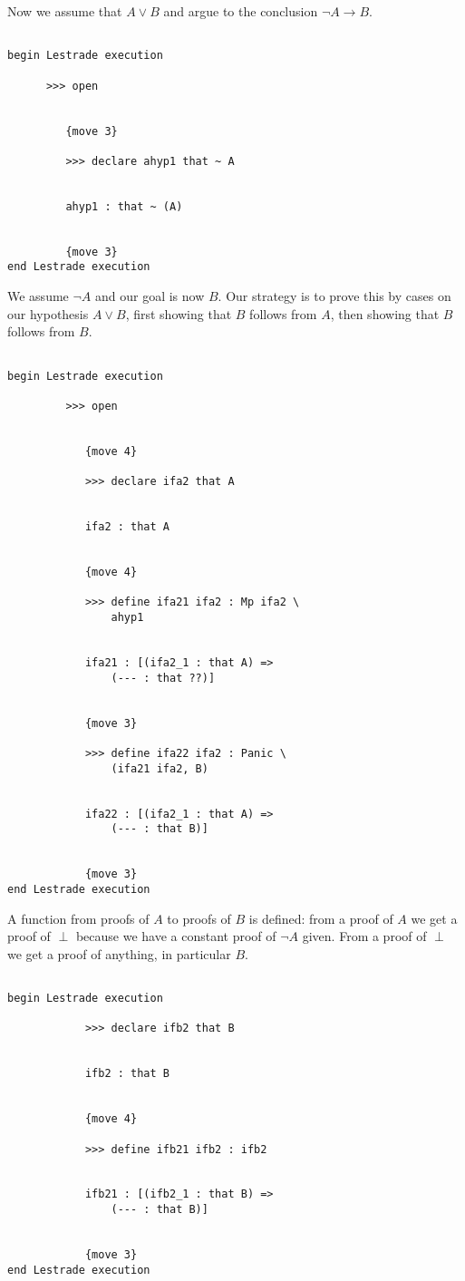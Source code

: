 \documentclass[12pt]{article}
\begin{document}
Now we assume that $A \vee B$ and argue to the conclusion $\neg A \rightarrow B$.

\begin{verbatim}

begin Lestrade execution

      >>> open


         {move 3}

         >>> declare ahyp1 that ~ A


         ahyp1 : that ~ (A)


         {move 3}
end Lestrade execution
\end{verbatim}

We assume $\neg A$ and our goal is now $B$.  Our strategy is to prove this by cases on our hypothesis $A \vee B$, first showing that $B$ follows from $A$,
then showing that $B$ follows from $B$.

\begin{verbatim}

begin Lestrade execution

         >>> open


            {move 4}

            >>> declare ifa2 that A


            ifa2 : that A


            {move 4}

            >>> define ifa21 ifa2 : Mp ifa2 \
                ahyp1


            ifa21 : [(ifa2_1 : that A) => 
                (--- : that ??)]


            {move 3}

            >>> define ifa22 ifa2 : Panic \
                (ifa21 ifa2, B)


            ifa22 : [(ifa2_1 : that A) => 
                (--- : that B)]


            {move 3}
end Lestrade execution
\end{verbatim}

A function from proofs of $A$ to proofs of $B$ is defined:  from a proof of $A$ we get a proof of $\perp$ because we
have a constant proof of $\neg A$ given.  From a proof of $\perp$ we get a proof of anything, in particular $B$.

\begin{verbatim}

begin Lestrade execution

            >>> declare ifb2 that B


            ifb2 : that B


            {move 4}

            >>> define ifb21 ifb2 : ifb2


            ifb21 : [(ifb2_1 : that B) => 
                (--- : that B)]


            {move 3}
end Lestrade execution
\end{verbatim}
\end{document}
